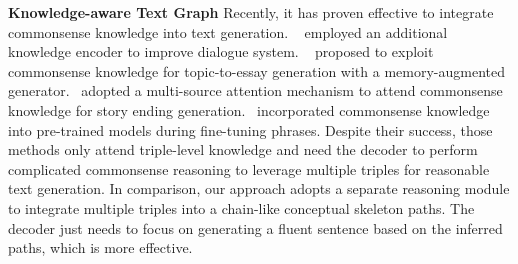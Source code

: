 \documentclass[letterpaper]{article} %
\begin{document}

\medskip\noindent\textbf{Knowledge-aware Text Graph}\hspace{1em}
Recently, it has proven effective to integrate commonsense knowledge into text generation.
~\citet{knowledge-one} employed an additional knowledge encoder to improve dialogue system. ~\cite{knowledge-three} proposed to exploit commonsense knowledge for topic-to-essay generation with a memory-augmented generator.~\citet{knowledge-guan} adopted a multi-source attention mechanism to attend commonsense knowledge for story ending generation.~\citet{gpt2-ke} incorporated commonsense knowledge into pre-trained models during fine-tuning phrases. Despite their success, those  methods only attend triple-level 
knowledge and need the decoder to perform complicated  commonsense reasoning to leverage multiple triples for reasonable text generation. In comparison, our approach adopts a separate reasoning module to integrate multiple triples into a chain-like conceptual skeleton paths. The decoder just needs to focus on  generating a fluent sentence based on the inferred paths, which is more effective.
\end{document}
